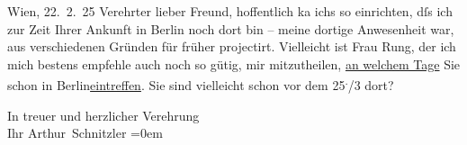 \pstart
           \raggedleft{}{\pb}Wien, 22. 2. 25\pend
           \vspace{0.5em}
\pstart
           Verehrter lieber Freund, hoffentlich ka{\geminationn} ichs so einrichten, dſs ich zur Zeit Ihrer Ankunft in Berlin noch dort bin – meine dortige Anwesenheit war, aus
               verschiedenen Gründen für früher projectirt. Vielleicht ist Frau Rung, der ich mich bestens empfehle auch noch so gütig, mir
               mitzutheilen, \uline{an welchem Tage} Sie schon in Berlin\uline{eintreffen}. Sie sind vielleicht schon vor dem 25\substVorne{}\textsuperscript{.}\substDazwischen{}/3\substHinten{} dort?\pend
           
\pstart
           In treuer und herzlicher Verehrung{\\[\baselineskip]}Ihr \spacefill\mbox{Arthur Schnitzler}\pend
           \leftskip=0em{}\endnumbering{}  \newcommand{\dateiname}{L02434}\newcommand{\titel}{Arthur Schnitzler an Georg Brandes, 22. 2. 1925}\newcommand{\editorInnen}{Martin Anton Müller und Gerd-Hermann Susen}
